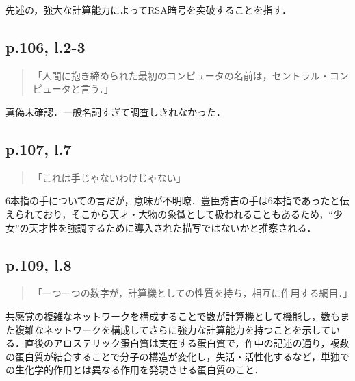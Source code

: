 \documentclass[10pt, a5paper, twoside]{jsarticle}
\theoremstyle{definition}
\begin{document}
			先述の，強大な計算能力によってRSA暗号を突破することを指す．

		\subsection{p.106, l.2-3}

			\begin{quote}

				「人間に抱き締められた最初のコンピュータの名前は，セントラル・コンピュータと言う．」
				
			\end{quote}

			真偽未確認．一般名詞すぎて調査しきれなかった．

		\subsection{p.107, l.7}

			\begin{quote}

				「これは手じゃないわけじゃない」
				
			\end{quote}

			6本指の手についての言だが，意味が不明瞭．豊臣秀吉の手は6本指であったと伝えられており，そこから天才・大物の象徴として扱われることもあるため，“少女”の天才性を強調するために導入された描写ではないかと推察される．

		\subsection{p.109, l.8}

			\begin{quote}

				「一つ一つの数字が，計算機としての性質を持ち，相互に作用する網目．」
				
			\end{quote}

			共感覚の複雑なネットワークを構成することで数が計算機として機能し，数もまた複雑なネットワークを構成してさらに強力な計算能力を持つことを示している．直後のアロステリック蛋白質は実在する蛋白質で，作中の記述の通り，複数の蛋白質が結合することで分子の構造が変化し，失活・活性化するなど，単独での生化学的作用とは異なる作用を発現させる蛋白質のこと．
\end{document}
